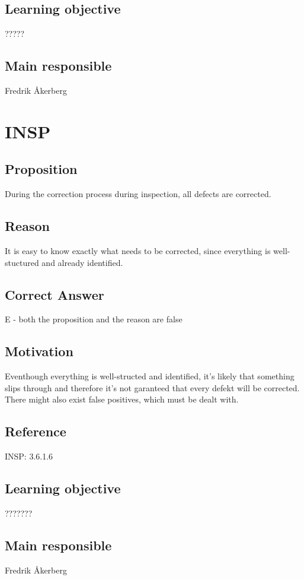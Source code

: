 \documentclass[a4paper]{article}
\begin{document}
\subsection*{Learning objective}
?????
\subsection*{Main responsible}
 Fredrik Åkerberg


\section{INSP}
\subsection*{Proposition}
During the correction process during inspection, all defects are corrected.
\subsection*{Reason}
 It is easy to know exactly what needs to be corrected, since everything is well-stuctured and already identified.
\subsection*{Correct Answer}
E - both the proposition and the reason are false
\subsection*{Motivation}
Eventhough everything is well-structed and identified, it's likely that something slips through and therefore it's not garanteed that every defekt will be corrected.
There might also exist false positives, which must be dealt with.
\subsection*{Reference}
INSP: 3.6.1.6
\subsection*{Learning objective}
???????
\subsection*{Main responsible}
Fredrik Åkerberg
\end{document}
